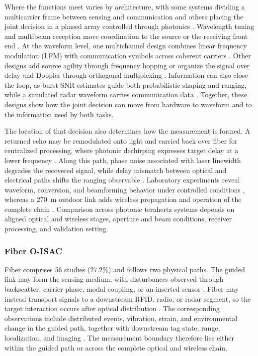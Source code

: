 Where the functions meet varies by architecture, with some systems dividing a
multicarrier frame between sensing and communication and others placing the
joint decision in a phased array controlled through photonics
\cite{OISAC_SCR01054,OISAC_SCR00036}. Wavelength tuning and multibeam reception
move coordination to the source or the receiving front end
\cite{OISAC_SCR00185,OISAC_SCR00396}. At the waveform level, one multichannel
design combines linear frequency modulation (LFM) with communication symbols
across coherent carriers \cite{OISAC_SCR00988}. Other designs add source
agility through frequency hopping or organize the signal over delay and Doppler
through orthogonal multiplexing \cite{OISAC_SCR00992,OISAC_SCR00973}.
Information can also close the loop, as burst SNR estimates guide both
probabilistic shaping and ranging, while a simulated radar waveform carries
communication data \cite{OISAC_SCR00989,OISAC_SCR00882}. Together, these
designs show how the joint decision can move from hardware to waveform and to
the information used by both tasks.

\FloatBarrier

The location of that decision also determines how the measurement is formed. A
returned echo may be remodulated onto light and carried back over fiber for
centralized processing, where photonic dechirping expresses target delay at a
lower frequency \cite{OISAC_SCR00966,OISAC_SCR00992}. Along this path, phase
noise associated with laser linewidth degrades the recovered signal, while
delay mismatch between optical and electrical paths shifts the ranging
observable \cite{OISAC_SCR00966}.
Laboratory experiments reveal waveform, conversion, and beamforming behavior
under controlled conditions \cite{OISAC_SCR00988,OISAC_SCR00036}, whereas a
270~m outdoor link adds wireless propagation and operation of the complete
chain \cite{OISAC_SCR01054}. Comparison across photonic terahertz systems
depends on aligned optical and wireless stages, aperture and beam conditions,
receiver processing, and validation setting.

\subsubsection{Fiber O-ISAC}

Fiber comprises 56 studies (27.2\%) and follows two physical paths. The guided
link may form the sensing medium, with disturbances observed through
backscatter, carrier phase, modal coupling, or an inserted sensor
\cite{OISAC_SCR00957,OISAC_SCR00432,OISAC_SCR00356,OISAC_SCR00679}. Fiber may
instead transport signals to a downstream RFID, radio, or radar segment, so the
target interaction occurs after optical distribution
\cite{OISAC_SCR00496,OISAC_SCR00631,OISAC_SCR00719,OISAC_SCR00983,OISAC_SCR01049}.
The corresponding observations include distributed events, vibration, strain,
and environmental change in the guided path, together with downstream tag
state, range, localization, and imaging
\cite{OISAC_SCR00957,OISAC_SCR00631,OISAC_SCR00496}. The measurement boundary
therefore lies either within the guided path or across the complete optical and
wireless chain.

